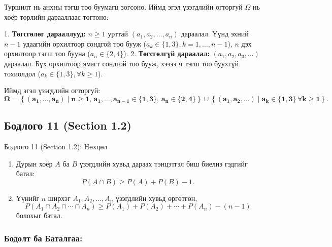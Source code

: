 \documentclass[11pt,a4paper]{article}
\begin{document}
Туршилт нь анхны тэгш тоо буумагц зогсоно. Иймд эгэл үзэгдлийн огторгуй $\Omega$ нь хоёр төрлийн дарааллаас тогтоно:

1. 				\textbf{Төгсгөлөг дарааллууд:} $n \ge 1$ урттай $(a_1, a_2, \dots, a_n)$ дараалал. Үүнд эхний $n-1$ удаагийн орхилтоор сондгой тоо бууж ($a_k \in \{1, 3\}, k = 1, \dots, n-1$), $n$ дэх орхилтоор тэгш тоо бууна ($a_n \in \{2, 4\}$).
2. 				\textbf{Төгсгөлгүй дараалал:} $(a_1, a_2, a_3, \dots)$ дараалал. Бүх орхилтоор ямагт сондгой тоо бууж, хэзээ ч тэгш тоо буухгүй тохиолдол ($a_k \in \{1, 3\}, \forall k \ge 1$).

Иймд эгэл үзэгдлийн огторгуй:
\[
  \mathbf{\Omega = \left\{ (a_1, \ldots, a_n) \mid n \ge 1, \, a_1, \ldots, a_{n-1} \in \{1, 3\}, \, a_n \in \{2, 4\} \right\} \cup \left\{ (a_1, a_2, \ldots) \mid a_k \in \{1, 3\} \, \forall k \ge 1 \right\}}.
\]

\vspace{0.8em}

\subsection*{Бодлого 11 (Section 1.2)}

\begin{problembox}{Бодлого 11 (Section 1.2): Нөхцөл}
\begin{enumerate}[label=\textbf{(\alph*)}, leftmargin=1.8em, itemsep=1pt]
  \item Дурын хоёр $A$ ба $B$ үзэгдлийн хувьд дараах тэнцэтгэл биш биелнэ гэдгийг батал:
  \[
    P(A \cap B) \ge P(A) + P(B) - 1.
  \]
  \item Үүнийг $n$ ширхэг $A_1, A_2, \ldots, A_n$ үзэгдлийн хувьд өргөтгөн,
  \[
    P(A_1 \cap A_2 \cap \cdots \cap A_n) \ge P(A_1) + P(A_2) + \cdots + P(A_n) - (n - 1)
  \]
  болохыг батал.
\end{enumerate}
\end{problembox}

\subsubsection*{Бодолт ба Баталгаа:}
\end{document}
